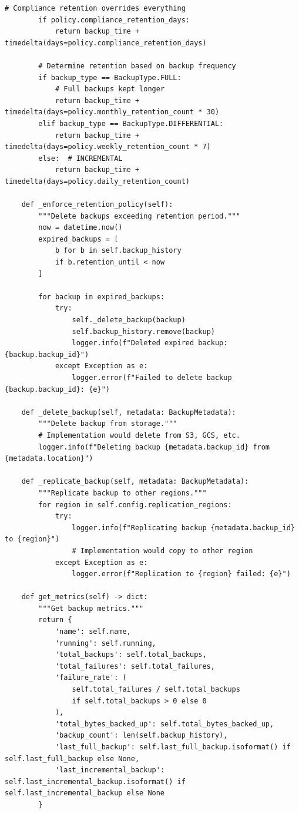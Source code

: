 \begin{lstlisting}[style=python, caption={Backup Scheduler with Retention Policies}]
        # Compliance retention overrides everything
        if policy.compliance_retention_days:
            return backup_time + timedelta(days=policy.compliance_retention_days)

        # Determine retention based on backup frequency
        if backup_type == BackupType.FULL:
            # Full backups kept longer
            return backup_time + timedelta(days=policy.monthly_retention_count * 30)
        elif backup_type == BackupType.DIFFERENTIAL:
            return backup_time + timedelta(days=policy.weekly_retention_count * 7)
        else:  # INCREMENTAL
            return backup_time + timedelta(days=policy.daily_retention_count)

    def _enforce_retention_policy(self):
        """Delete backups exceeding retention period."""
        now = datetime.now()
        expired_backups = [
            b for b in self.backup_history
            if b.retention_until < now
        ]

        for backup in expired_backups:
            try:
                self._delete_backup(backup)
                self.backup_history.remove(backup)
                logger.info(f"Deleted expired backup: {backup.backup_id}")
            except Exception as e:
                logger.error(f"Failed to delete backup {backup.backup_id}: {e}")

    def _delete_backup(self, metadata: BackupMetadata):
        """Delete backup from storage."""
        # Implementation would delete from S3, GCS, etc.
        logger.info(f"Deleting backup {metadata.backup_id} from {metadata.location}")

    def _replicate_backup(self, metadata: BackupMetadata):
        """Replicate backup to other regions."""
        for region in self.config.replication_regions:
            try:
                logger.info(f"Replicating backup {metadata.backup_id} to {region}")
                # Implementation would copy to other region
            except Exception as e:
                logger.error(f"Replication to {region} failed: {e}")

    def get_metrics(self) -> dict:
        """Get backup metrics."""
        return {
            'name': self.name,
            'running': self.running,
            'total_backups': self.total_backups,
            'total_failures': self.total_failures,
            'failure_rate': (
                self.total_failures / self.total_backups
                if self.total_backups > 0 else 0
            ),
            'total_bytes_backed_up': self.total_bytes_backed_up,
            'backup_count': len(self.backup_history),
            'last_full_backup': self.last_full_backup.isoformat() if self.last_full_backup else None,
            'last_incremental_backup': self.last_incremental_backup.isoformat() if self.last_incremental_backup else None
        }


\end{lstlisting}
